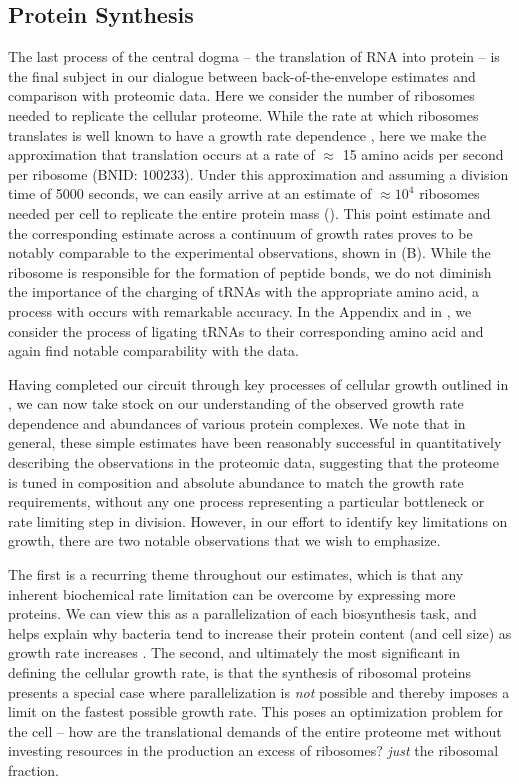 \subsection{Protein Synthesis}
The last process of the central dogma -- the translation of RNA into protein
-- is the final subject in our dialogue between back-of-the-envelope
estimates and comparison with proteomic data. Here we consider the number of
ribosomes needed to replicate the cellular proteome. While the rate at which
ribosomes translates is well known to have a growth rate dependence
\citep{dai2018}, here we make the approximation that translation occurs at a
rate of $\approx$ 15 amino acids per second per ribosome (BNID: 100233).
Under this approximation and assuming a division time of 5000 seconds, we can
easily arrive at an estimate of $\approx 10^4$ ribosomes needed per cell to
replicate the entire protein mass (). This point
estimate and the corresponding estimate across a continuum of growth rates
proves to be notably comparable to the experimental observations, shown in
(B). While the ribosome is responsible for the
formation of peptide bonds, we do not diminish the importance of the charging
of tRNAs with the appropriate amino acid, a process with occurs with
remarkable accuracy. In the Appendix and in
, we consider the process of ligating tRNAs
to their corresponding amino acid and again find notable comparability with
the data.

Having completed our circuit through key processes of cellular growth
outlined in , we can now take stock on our understanding of the
observed growth rate dependence and abundances of various protein complexes. We
note that in general, these simple estimates have been reasonably successful in
quantitatively describing the observations in the proteomic data, suggesting
that the proteome is tuned in composition and absolute abundance to match the
growth rate requirements, without any one process representing a particular
bottleneck or rate limiting step in division. However, in our effort to identify
key limitations on growth, there are two notable observations that we wish to
emphasize.

The first is a recurring theme throughout our estimates, which is that any
inherent biochemical rate limitation can be overcome by expressing more
proteins. We can view this as a parallelization of each biosynthesis task,
and helps explain why bacteria tend to increase their protein content (and
cell size) as growth rate increases \citep{ojkic2019}. The second, and ultimately
the most significant in defining the cellular growth rate, is that the
synthesis of ribosomal proteins presents a special case where parallelization
is \textit{not} possible and thereby imposes a limit on the fastest possible
growth rate. This poses an optimization problem for
the cell -- how are the translational demands of the entire proteome met without
investing resources in the production an excess of ribosomes?
 \textit{just} the ribosomal fraction.

